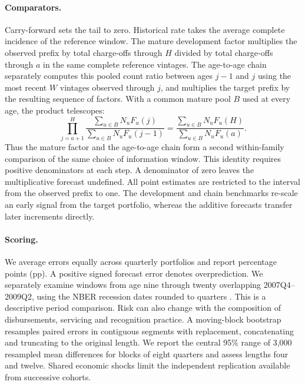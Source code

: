\documentclass[11pt]{article}
\begin{document}
\paragraph{Comparators.}
Carry-forward sets the tail to zero. Historical rate takes the average complete incidence of the reference window. The mature development factor multiplies the observed prefix by total charge-offs through $H$ divided by total charge-offs through $a$ in the same complete reference vintages. The age-to-age chain separately computes this pooled count ratio between ages $j-1$ and $j$ using the most recent $W$ vintages observed through $j$, and multiplies the target prefix by the resulting sequence of factors. With a common mature pool $B$ used at every age, the product telescopes:
\[
 \prod_{j=a+1}^{H}\frac{\sum_{u\in B}N_u F_u(j)}
                           {\sum_{u\in B}N_u F_u(j-1)}
  = \frac{\sum_{u\in B}N_u F_u(H)}{\sum_{u\in B}N_u F_u(a)}.
\]
Thus the mature factor and the age-to-age chain form a second within-family comparison of the same choice of information window. This identity requires positive denominators at each step. A denominator of zero leaves the multiplicative forecast undefined. All point estimates are restricted to the interval from the observed prefix to one. The development and chain benchmarks re-scale an early signal from the target portfolio, whereas the additive forecasts transfer later increments directly.

\paragraph{Scoring.}
We average errors equally across quarterly portfolios and report percentage points (pp). A positive signed forecast error denotes overprediction. We separately examine windows from age nine through twenty overlapping 2007Q4--2009Q2, using the NBER recession dates rounded to quarters \cite{nber}. This is a descriptive period comparison. Risk can also change with the composition of disbursements, servicing and recognition practice. A moving-block bootstrap resamples paired errors in contiguous segments with replacement, concatenating and truncating to the original length. We report the central 95\% range of 3,000 resampled mean differences for blocks of eight quarters and assess lengths four and twelve. Shared economic shocks limit the independent replication available from successive cohorts.
\end{document}
